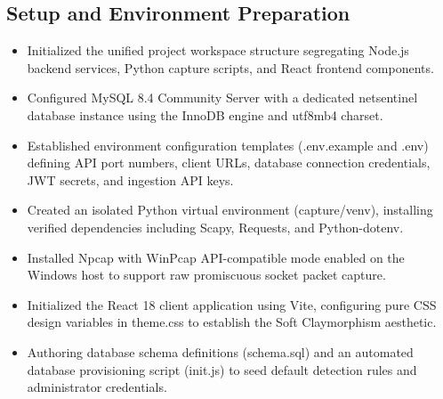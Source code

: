 \documentclass[a4paper,12pt]{report}
\begin{document}
	\subsection{Setup and Environment Preparation}
	\begin{itemize}
		\item Initialized the unified project workspace structure segregating Node.js backend services, Python capture scripts, and React frontend components.
		\item Configured MySQL 8.4 Community Server with a dedicated netsentinel database instance using the InnoDB engine and utf8mb4 charset.
		\item Established environment configuration templates (.env.example and .env) defining API port numbers, client URLs, database connection credentials, JWT secrets, and ingestion API keys.
		\item Created an isolated Python virtual environment (capture/venv), installing verified dependencies including Scapy, Requests, and Python-dotenv.
		\item Installed Npcap with WinPcap API-compatible mode enabled on the Windows host to support raw promiscuous socket packet capture.
		\item Initialized the React 18 client application using Vite, configuring pure CSS design variables in theme.css to establish the Soft Claymorphism aesthetic.
		\item Authoring database schema definitions (schema.sql) and an automated database provisioning script (init.js) to seed default detection rules and administrator credentials.
	\end{itemize}
	
\end{document}
